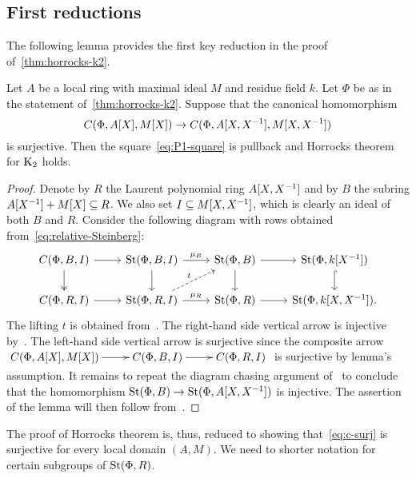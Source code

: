 \subsection{First reductions} \label{subsec:structure-theorem-overview}

The following lemma provides the first key reduction in the proof of~\cref{thm:horrocks-k2}.
\begin{lemma} \label{lem:first-reduction}
Let $A$ be a local ring with maximal ideal $M$ and residue field $k$.
Let $\Phi$ be as in the statement of~\cref{thm:horrocks-k2}.
Suppose that the canonical homomorphism
\begin{equation} \label{eq:c-surj} C(\Phi, A[X], M[X]) \to C(\Phi, A[X, X^{-1}], M[X, X^{-1}]) \end{equation}
is surjective.
Then the square~\eqref{eq:P1-square} is pullback and Horrocks theorem for $\operatorname{K}_2$ holds.
\end{lemma}
\begin{proof}
    Denote by $R$ the Laurent polynomial ring $A[X, X^{-1}]$ and by $B$ the subring $A[X^{-1}] + M[X] \subseteq R$.
    We also set $I \subseteq M[X, X^{-1}]$, which is clearly an ideal of both $B$ and $R$.
    Consider the following diagram with rows obtained from~\eqref{eq:relative-Steinberg}:
    \[\begin{tikzcd}
          C(\Phi, B, I) \arrow{r} \arrow[d, swap, twoheadrightarrow] & \St(\Phi, B, I) \arrow{r}{\mu_B} \arrow{d} & \St(\Phi, B) \arrow{r} \arrow{d} & \St(\Phi, k[X^{-1}]) \arrow[hookrightarrow]{d} \\
          C(\Phi, R, I) \arrow{r} & \St(\Phi, R, I) \arrow{r}{\mu_R} \arrow[ur, "t", dashrightarrow] & \St(\Phi, R) \arrow{r} & \St(\Phi, k[X, X^{-1}]).
    \end{tikzcd}\]
    The lifting $t$ is obtained from~\cite[Lemma~3.3]{LS20}.
    The right-hand side vertical arrow is injective by~\cite[Lemma~2.2]{LS20}.
    The left-hand side vertical arrow is surjective since the composite arrow
    $\xymatrix{ C(\Phi, A[X], M[X]) \ar[r] & C(\Phi, B, I) \ar[r] & C(\Phi, R, I) }$
    is surjective by lemma's assumption.
    It remains to repeat the diagram chasing argument of~\cite[Theorem~1]{LS20} to conclude that the homomorphism $\operatorname{St}(\Phi, B) \to \operatorname{St}(\Phi, A[X, X^{-1}])$ is injective.
    The assertion of the lemma will then follow from~\cite[Theorem~3]{LS20}.
\end{proof}
The proof of Horrocks theorem is, thus, reduced to showing that~\eqref{eq:c-surj} is surjective for every local domain $(A, M)$.
We need to shorter notation for certain subgroups of $\operatorname{St}(\Phi, R)$.

